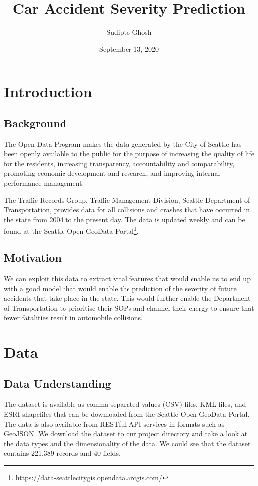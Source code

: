 \documentclass{article}
\begin{document}
\title{Car Accident Severity Prediction}
\author{Sudipto Ghosh}
\date{September 13, 2020}
\maketitle

\section{Introduction}

\subsection{Background}
The Open Data Program makes the data generated by the City of Seattle has been openly available to the public for the purpose of increasing the quality of life for the residents, increasing transparency, accountability and comparability, promoting economic development and research, and improving internal performance management.

The Traffic Records Group, Traffic Management Division, Seattle Department of Transportation, provides data for all collisions and crashes that have occurred in the state from 2004 to the present day. The data is updated weekly and can be found at the Seattle Open GeoData Portal\footnote[1]{\href{https://data-seattlecitygis.opendata.arcgis.com/}{https://data-seattlecitygis.opendata.arcgis.com/}}.

\subsection{Motivation}
We can exploit this data to extract vital features that would enable us to end up with a good model that would enable the prediction of the severity of future accidents that take place in the state. This would further enable the Department of Transportation to prioritise their SOPs and channel their energy to ensure that fewer fatalities result in automobile collisions.

\section{Data}

\subsection{Data Understanding}
The dataset is available as comma-separated values (CSV) files, KML files, and ESRI shapefiles that can be downloaded from the Seattle Open GeoData Portal. The data is also available from RESTful API services in formats such as GeoJSON. We download the dataset to our project directory and take a look at the data types and the dimensionality of the data. We could see that the dataset contains 221,389 records and 40 fields.
\end{document}
